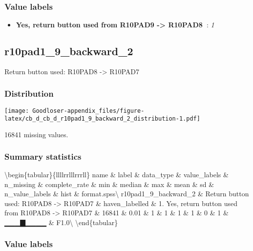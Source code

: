 \documentclass[
]{book}
\providecommand{\tightlist}{%
  \setlength{\itemsep}{0pt}\setlength{\parskip}{0pt}}
\begin{document}
\hypertarget{r10pad1_9_backward_1_labels}{%
\subsubsection{Value labels}\label{r10pad1_9_backward_1_labels}}

\begin{itemize}
\tightlist
\item
  \textbf{Yes, return button used from R10PAD9 -\textgreater{} R10PAD8~}: \emph{1}
\end{itemize}

\hypertarget{r10pad1_9_backward_2}{%
\subsection{r10pad1\_9\_backward\_2}\label{r10pad1_9_backward_2}}

Return button used: R10PAD8 -\textgreater{} R10PAD7

\hypertarget{r10pad1_9_backward_2_distribution}{%
\subsubsection{Distribution}\label{r10pad1_9_backward_2_distribution}}

\texttt{[image: Goodloser-appendix\_files/figure-latex/cb\_d\_cb\_d\_r10pad1\_9\_backward\_2\_distribution-1.pdf]}

16841 missing values.

\hypertarget{r10pad1_9_backward_2_summary}{%
\subsubsection{Summary statistics}\label{r10pad1_9_backward_2_summary}}

\textbackslash begin\{tabular\}\{l\textbar l\textbar l\textbar l\textbar r\textbar r\textbar l\textbar l\textbar l\textbar r\textbar r\textbar r\textbar l\textbar l\}
\hline
name \& label \& data\_type \& value\_labels \& n\_missing \& complete\_rate \& min \& median \& max \& mean \& sd \& n\_value\_labels \& hist \& format.spss\textbackslash{}
\hline
r10pad1\_9\_backward\_2 \& Return button used: R10PAD8 -\textgreater{} R10PAD7 \& haven\_labelled \& 1. Yes, return button used from R10PAD8 -\textgreater{} R10PAD7 \& 16841 \& 0.01 \& 1 \& 1 \& 1 \& 1 \& 0 \& 1 \& ▁▁▁▇▁▁▁▁ \& F1.0\textbackslash{}
\hline
\textbackslash end\{tabular\}

\hypertarget{r10pad1_9_backward_2_labels}{%
\subsubsection{Value labels}\label{r10pad1_9_backward_2_labels}}
\end{document}
